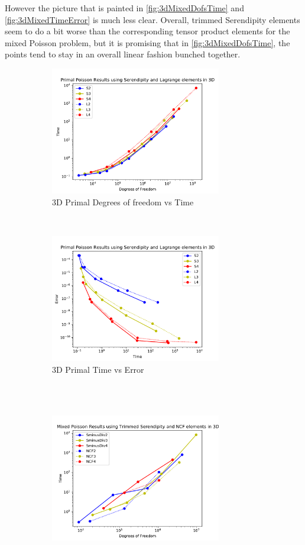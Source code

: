 \documentclass[manuscript,screen]{acmart}
\begin{document}
However the picture that is painted in \ref{fig:3dMixedDofsTime} and \ref{fig:3dMixedTimeError} is much less clear.  Overall, trimmed Serendipity elements seem to do a bit worse than the corresponding tensor product elements for the mixed Poisson problem, but it is promising that in \ref{fig:3dMixedDofsTime}, the points tend to stay in an overall linear fashion bunched together. 

\newpage

\begin{figure}[ht]
  \centering
  \begin{subfigure}[h]{0.5\textwidth}
    \centering
    \includegraphics[height=2.2in]{3dPrimalDofsTime.pdf}
    \caption{3D Primal Degrees of freedom vs Time}
    \label{fig:3dPrimalDofsTime}
  \end{subfigure}
  ~
  \begin{subfigure}[h]{0.5\textwidth}
    \centering
    \includegraphics[height=2.2in]{3dPrimalTimeError.pdf}
    \caption{3D Primal Time vs Error}
    \label{fig:3dPrimalTimeError}
  \end{subfigure}\\
  ~
  \begin{subfigure}[h]{0.5\textwidth}
    \centering
    \includegraphics[height=2.2in]{3dMixedPoissonDofsTime.pdf}

\end{subfigure}
\end{figure}
\end{document}
